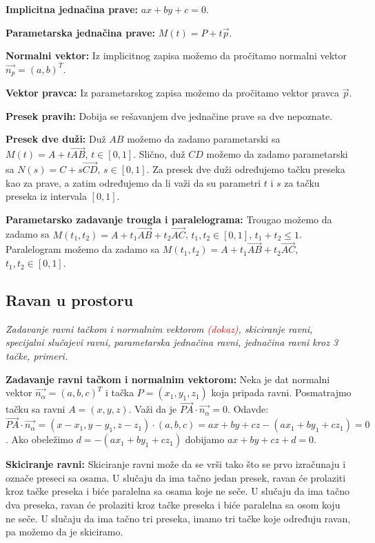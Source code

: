 \documentclass[12pt]{article}
\newcommand{\vek}[1]{\overrightarrow{#1}}
\newcommand{\ocena}[1]{\textcolor{red}{#1}}
\begin{document}
\textbf{Implicitna jednačina prave:} $ax+by+c=0$.
\par

\textbf{Parametarska jednačina prave:} $M(t)=P+t\vek{p}$.
\par

\textbf{Normalni vektor:} Iz implicitnog zapisa možemo da pročitamo normalni
vektor $\vek{n_p}=(a,b)^T$.
\par

\textbf{Vektor pravca:} Iz parametarskog zapisa možemo da pročitamo vektor
pravca $\vek{p}$.
\par

\textbf{Presek pravih:} Dobija se rešavanjem dve jednačine prave sa dve
nepoznate.
\par

\textbf{Presek dve duži:} Duž $AB$ možemo da zadamo parametarski sa
$M(t)=A+t\vek{AB}$, $t\in[0,1]$. Slično, duž $CD$ možemo da zadamo parametarski sa $N(s)=C+s\vek{CD}$, $s\in[0,1]$.
Za presek dve duži određujemo tačku preseka kao za prave, a zatim određujemo da li važi da su
parametri $t$ i $s$ za tačku preseka iz intervala $[0,1]$.
\par

\textbf{Parametarsko zadavanje trougla i paralelograma:} Trougao možemo da
zadamo sa $M(t_1,t_2)=A+t_1\vek{AB}+t_2\vek{AC}$, $t_1,t_2\in[0,1]$, $t_1+t_2\leq1$.
Paralelogram možemo da zadamo sa $M(t_1,t_2)=A+t_1\vek{AB}+t_2\vek{AC}$, $t_1,t_2\in[0,1]$.

\subsection{Ravan u prostoru}
\textit{Zadavanje ravni tačkom i normalnim vektorom \ocena{(dokaz)}, skiciranje ravni,
    specijalni slučajevi ravni, parametarska jednačina ravni, jednačina ravni kroz
    3 tačke, primeri.}
\par
\vspace*{1cm}

\textbf{Zadavanje ravni tačkom i normalnim vektorom:} Neka je dat normalni
vektor $\vek{n_\alpha}=(a,b,c)^T$ i tačka $P=(x_1,y_1,z_1)$ koja pripada ravni.
Posmatrajmo tačku sa ravni $A=(x,y,z)$. Važi da je
$\vek{PA}\cdot\vek{n_\alpha}=0$. Odavde:
$\vek{PA}\cdot\vek{n_\alpha}=(x-x_1,y-y_1,z-z_1)\cdot(a,b,c)=ax+by+cz-
    (ax_1+by_1+cz_1)=0$. Ako obeležimo $d=-(ax_1+by_1+cz_1)$ dobijamo
$ax+by+cz+d=0$.
\par

\textbf{Skiciranje ravni:} Skiciranje ravni može da se vrši tako što se prvo
izračunaju i označe preseci sa osama. U slučaju da ima tačno jedan presek,
ravan će prolaziti kroz tačke preseka i biće paralelna sa osama koje ne
seče. U slučaju da ima tačno dva preseka, ravan će prolaziti kroz tačke
preseka i biće paralelna sa osom koju ne seče. U slučaju da ima tačno tri
preseka, imamo tri tačke koje određuju ravan, pa možemo da je skiciramo.
\par
\end{document}
